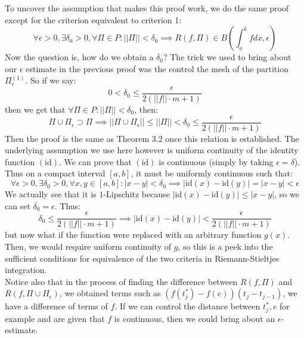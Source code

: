 \documentclass[10pt,letterpaper]{article} %
\begin{document}
To uncover the assumption that makes this proof work, we do the same proof except for the criterion equivalent to criterion 1:
\begin{equation*}
\forall \epsilon > 0, \exists \delta_0 > 0, \forall \Pi \in P: ||\Pi|| < \delta_0 \implies R(f, \Pi) \in B\left(\int_{a}^{b}fdx, \epsilon\right)  
\end{equation*}
Now the question is, how do we obtain a $\delta_0$? The trick we used to bring about our $\epsilon$ estimate in the previous proof was the control the mesh of the partition $\Pi_\epsilon^{(1)}$. So if we say:
\begin{equation*}
0 < \delta_0 \leqslant \frac{\epsilon}{2(||f|| \cdot m + 1)}
\end{equation*}
then we get that $\forall \Pi \in P : ||\Pi|| < \delta_0$, then:
\begin{equation*}
\Pi \cup \Pi_\epsilon \supset \Pi \implies ||\Pi \cup \Pi_\epsilon|| \leqslant ||\Pi|| < \delta_0 \leqslant \frac{\epsilon}{2(||f||\cdot m + 1)}
\end{equation*}
Then the proof is the same as Theorem 3.2 once this relation is established. The underlying assumption we use here however is uniform continuity of the identity function $(\text{id})$. We can prove that $(\text{id})$ is continuous (simply by taking $\epsilon = \delta$).\\

Thus on a compact interval $[a, b]$, it must be uniformly continuous such that:
\begin{equation*}
\forall \epsilon > 0, \exists \delta_0 > 0, \forall x, y \in [a, b]: |x-y| < \delta_0 \implies |\text{id}(x) - \text{id}(y)| = |x-y| < \epsilon
\end{equation*}
We actually see that it is $1$-Lipschitz because $|\text{id}(x) - \text{id}(y)| \leqslant |x-y|$, so we can set $\delta_0 = \epsilon$. Thus:
\begin{equation*}
\delta_0 \leqslant \frac{\epsilon}{2(||f||\cdot m + 1)} \implies |\text{id}(x) - \text{id}(y)| < \frac{\epsilon}{2(||f|| \cdot m + 1)}
\end{equation*}
but now what if the function were replaced with an arbitrary function $g(x)$. Then, we would require uniform continuity of $g$, so this is a peek into the sufficient conditions for equivalence of the two criteria in Riemann-Stieltjes integration.\\

Notice also that in the process of finding the difference between $R(f, \Pi)$ and $R(f, \Pi \cup \Pi_\epsilon)$, we obtained terms such as $(f(t_j^*) - f(e))(t_j - t_{j-1})$, we have a difference of terms of $f$. If we can control the distance between $t_j^*, e$ for example and are given that $f$ is continuous, then we could bring about an $\epsilon$-estimate.\\
\end{document}

